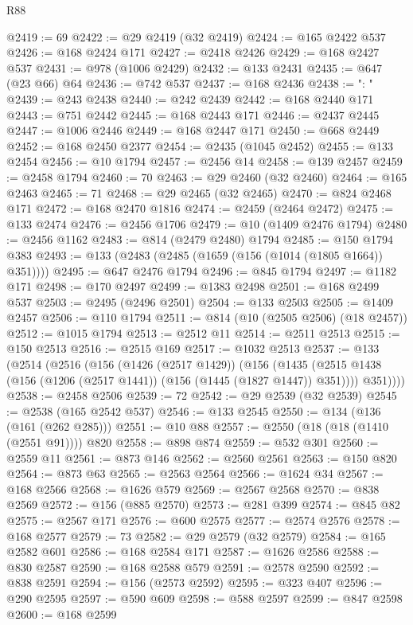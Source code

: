 \begin{lexlean}{R88}
\begin{coremodule}
@2419 := 69
@2422 := @29 @2419 (@32 @2419)
@2424 := @165 @2422 @537
@2426 := @168 @2424 @171
@2427 := @2418 @2426
@2429 := @168 @2427 @537
@2431 := @978 (@1006 @2429)
@2432 := @133 @2431
@2435 := @647 (@23 @66) @64
@2436 := @742 @537
@2437 := @168 @2436
@2438 := ": "
@2439 := @243 @2438
@2440 := @242 @2439
@2442 := @168 @2440 @171
@2443 := @751 @2442
@2445 := @168 @2443 @171
@2446 := @2437 @2445
@2447 := @1006 @2446
@2449 := @168 @2447 @171
@2450 := @668 @2449
@2452 := @168 @2450 @2377
@2454 := @2435 (@1045 @2452)
@2455 := @133 @2454
@2456 := @10 @1794
@2457 := @2456 @14
@2458 := @139 @2457
@2459 := @2458 @1794
@2460 := 70
@2463 := @29 @2460 (@32 @2460)
@2464 := @165 @2463
@2465 := 71
@2468 := @29 @2465 (@32 @2465)
@2470 := @824 @2468 @171
@2472 := @168 @2470 @1816
@2474 := @2459 (@2464 @2472)
@2475 := @133 @2474
@2476 := @2456 @1706
@2479 := @10 (@1409 @2476 @1794)
@2480 := @2456 @1162
@2483 := @814 (@2479 @2480) @1794
@2485 := @150 @1794 @383
@2493 := @133 (@2483 (@2485 (@1659 (@156 (@1014 (@1805 @1664)) @351))))
@2495 := @647 @2476 @1794
@2496 := @845 @1794
@2497 := @1182 @171
@2498 := @170 @2497
@2499 := @1383 @2498
@2501 := @168 @2499 @537
@2503 := @2495 (@2496 @2501)
@2504 := @133 @2503
@2505 := @1409 @2457
@2506 := @110 @1794
@2511 := @814 (@10 (@2505 @2506) (@18 @2457))
@2512 := @1015 @1794
@2513 := @2512 @11
@2514 := @2511 @2513
@2515 := @150 @2513
@2516 := @2515 @169
@2517 := @1032 @2513
@2537 := @133
    (@2514
      (@2516
        (@156
          (@1426 (@2517 @1429))
          (@156
            (@1435 (@2515 @1438 (@156 (@1206 (@2517 @1441)) (@156 (@1445 (@1827 @1447)) @351))))
            @351))))
@2538 := @2458 @2506
@2539 := 72
@2542 := @29 @2539 (@32 @2539)
@2545 := @2538 (@165 @2542 @537)
@2546 := @133 @2545
@2550 := @134 (@136 (@161 (@262 @285)))
@2551 := @10 @88
@2557 := @2550 (@18 (@18 (@1410 (@2551 @91)))) @820
@2558 := @898 @874
@2559 := @532 @301
@2560 := @2559 @11
@2561 := @873 @146
@2562 := @2560 @2561
@2563 := @150 @820
@2564 := @873 @63
@2565 := @2563 @2564
@2566 := @1624 @34
@2567 := @168 @2566
@2568 := @1626 @579
@2569 := @2567 @2568
@2570 := @838 @2569
@2572 := @156 (@885 @2570)
@2573 := @281 @399
@2574 := @845 @82
@2575 := @2567 @171
@2576 := @600 @2575
@2577 := @2574 @2576
@2578 := @168 @2577
@2579 := 73
@2582 := @29 @2579 (@32 @2579)
@2584 := @165 @2582 @601
@2586 := @168 @2584 @171
@2587 := @1626 @2586
@2588 := @830 @2587
@2590 := @168 @2588 @579
@2591 := @2578 @2590
@2592 := @838 @2591
@2594 := @156 (@2573 @2592)
@2595 := @323 @407
@2596 := @290 @2595
@2597 := @590 @609
@2598 := @588 @2597
@2599 := @847 @2598
@2600 := @168 @2599

\end{coremodule}
\end{lexlean}
